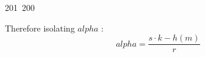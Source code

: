 201~200~\documentclass{article}
\begin{document}
	                                                                        	                                                                    	                                	                    	                    	                        	                        	                    	                                                                	                	                                                                    	                    							                                                                                                                                                                                                    	Therefore isolating $alpha$ : 
	                                                                        	                                                                    	                                	                    	                    	                        	                        	                    	                                                                	                	                                                                    	                    							                                                                                                                                                                                                    	\[
	                                                                        	                                                                    	                                	                    	                    	                        	                        	                    	                                                                	                	                                                                    	                    							                                                                                                                                                                                                    		alpha = \frac{s \cdot k - h(m)}{r}
	                                                                        	                                                                    	                                	                    	                    	                        	                        	                    	                                                                	                	                                                                    	                    							                                                                                                                                                                                                    		\]
\end{document}

